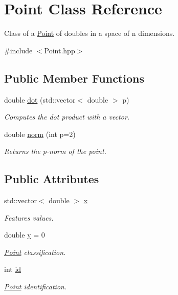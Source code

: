 \hypertarget{class_point}{}\section{Point Class Reference}
\label{class_point}


Class of a \hyperlink{class_point}{Point} of doubles in a space of n dimensions.  




{\ttfamily \#include $<$Point.\+hpp$>$}

\subsection*{Public Member Functions}
\begin{DoxyCompactItemize}
\item 
double \hyperlink{class_point_a9d8da6733d7e4110a62e8d0f82676761}{dot} (std\+::vector$<$ double $>$ p)
\begin{DoxyCompactList}\small\item\em Computes the dot product with a vector. \end{DoxyCompactList}\item 
double \hyperlink{class_point_aab64e3f0a9eecba00a1607eb4c7768c3}{norm} (int p=2)
\begin{DoxyCompactList}\small\item\em Returns the p-\/norm of the point. \end{DoxyCompactList}\end{DoxyCompactItemize}
\subsection*{Public Attributes}
\begin{DoxyCompactItemize}
\item 
\mbox{\label{class_point_a1e22056737f10e31025b353c86e3b9e3}} 
std\+::vector$<$ double $>$ \hyperlink{class_point_a1e22056737f10e31025b353c86e3b9e3}{x}
\begin{DoxyCompactList}\small\item\em Features values. \end{DoxyCompactList}\item 
\mbox{\label{class_point_afa38be143ae800e6ad69ce8ed4df62d8}} 
double \hyperlink{class_point_afa38be143ae800e6ad69ce8ed4df62d8}{y} = 0
\begin{DoxyCompactList}\small\item\em \hyperlink{class_point}{Point} classification. \end{DoxyCompactList}\item 
\mbox{\label{class_point_a3ccd2080027d6845744bd044280da9e7}} 
int \hyperlink{class_point_a3ccd2080027d6845744bd044280da9e7}{id}
\begin{DoxyCompactList}\small\item\em \hyperlink{class_point}{Point} identification. \end{DoxyCompactList}\end{DoxyCompactItemize}


